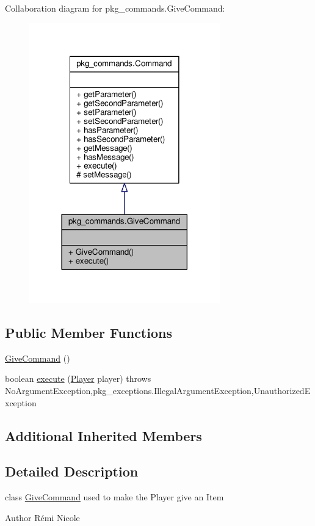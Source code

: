 Collaboration diagram for pkg\-\_\-commands.\-Give\-Command\-:
\nopagebreak
\begin{figure}[H]
\begin{center}
\leavevmode
\includegraphics[width=234pt]{classpkg__commands_1_1GiveCommand__coll__graph}
\end{center}
\end{figure}
\subsection*{Public Member Functions}
\begin{DoxyCompactItemize}
\item 
\hyperlink{classpkg__commands_1_1GiveCommand_a04e020a1f124119a2e7df19fac983953}{Give\-Command} ()
\item 
boolean \hyperlink{classpkg__commands_1_1GiveCommand_a3a3cca7fae9b86d8ff85cc166564843d}{execute} (\hyperlink{classpkg__world_1_1Player}{Player} player)  throws No\-Argument\-Exception,pkg\-\_\-exceptions.\-Illegal\-Argument\-Exception,\-Unauthorized\-Exception 
\end{DoxyCompactItemize}
\subsection*{Additional Inherited Members}


\subsection{Detailed Description}
class \hyperlink{classpkg__commands_1_1GiveCommand}{Give\-Command} used to make the Player give an Item \begin{DoxyAuthor}{Author}
Rémi Nicole 
\end{DoxyAuthor}



